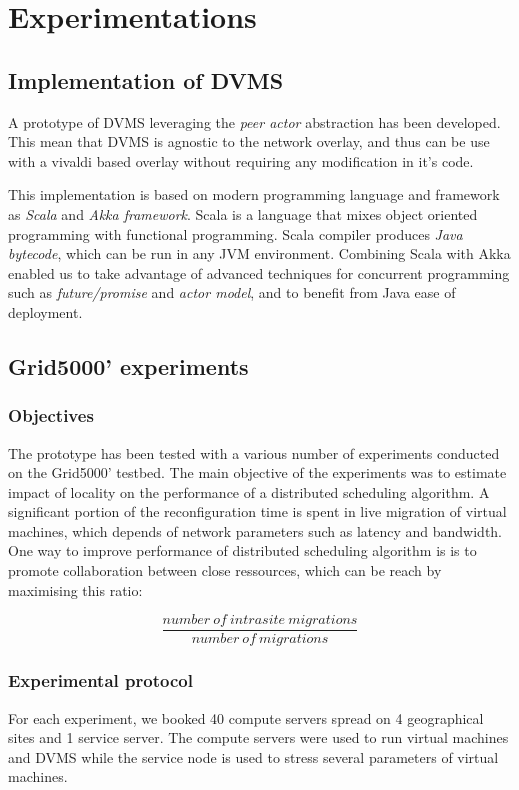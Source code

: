 \section{Experimentations}

\subsection{Implementation of DVMS}

A prototype of DVMS leveraging the \emph{peer actor} abstraction has been 
developed. This mean that DVMS is agnostic to the network overlay, and thus can
be use with a vivaldi based overlay without requiring any modification in it's 
code.

This implementation is based on modern programming language and framework as 
\emph{Scala} and \emph{Akka framework}. Scala is a language that mixes object
oriented programming with functional programming. Scala compiler produces 
\emph{Java bytecode}, which can be run in any JVM environment. Combining Scala 
with Akka enabled us to take advantage of advanced techniques for concurrent 
programming such as \emph{future/promise} and \emph{actor model}, and to benefit
from Java ease of deployment.



\subsection{Grid5000' experiments}

\subsubsection{Objectives}
The prototype has been tested with a various number of experiments conducted on
the Grid5000' testbed. The main objective of the experiments was to estimate
impact of locality on the performance of a distributed scheduling algorithm. 
A significant portion of the reconfiguration time is spent in live migration of
virtual machines, which depends of network parameters such as latency and
bandwidth. One way to improve performance of distributed scheduling algorithm is
is to promote collaboration between close ressources, which can be reach by 
maximising this ratio:

\[
	\frac{number\ of\ intrasite\ migrations}{number\ of\ migrations}
\]

\subsubsection{Experimental protocol}
For each experiment, we booked 40 compute servers spread on 4 geographical sites
and 1 service server. The compute servers were used to run virtual machines and
DVMS while the service node is used to stress several parameters of 
virtual machines.

